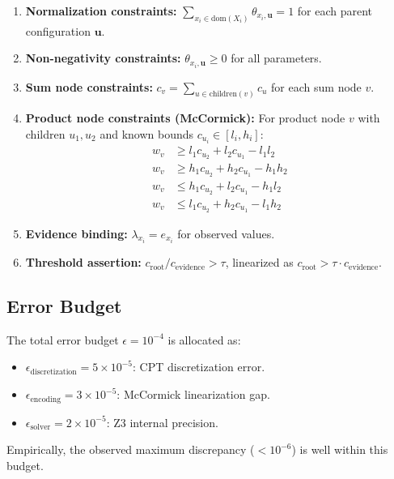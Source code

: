 \documentclass[11pt]{article}
\begin{document}
\begin{enumerate}[nosep]
  \item \textbf{Normalization constraints:}
  $\sum_{x_i \in \text{dom}(X_i)} \theta_{x_i, \mathbf{u}} = 1$ for each parent configuration $\mathbf{u}$.

  \item \textbf{Non-negativity constraints:}
  $\theta_{x_i, \mathbf{u}} \geq 0$ for all parameters.

  \item \textbf{Sum node constraints:}
  $c_v = \sum_{u \in \text{children}(v)} c_u$ for each sum node $v$.

  \item \textbf{Product node constraints (McCormick):}
  For product node $v$ with children $u_1, u_2$ and known bounds $c_{u_i} \in [l_i, h_i]$:
  \begin{align*}
    w_v &\geq l_1 c_{u_2} + l_2 c_{u_1} - l_1 l_2 \\
    w_v &\geq h_1 c_{u_2} + h_2 c_{u_1} - h_1 h_2 \\
    w_v &\leq h_1 c_{u_2} + l_2 c_{u_1} - h_1 l_2 \\
    w_v &\leq l_1 c_{u_2} + h_2 c_{u_1} - l_1 h_2
  \end{align*}

  \item \textbf{Evidence binding:}
  $\lambda_{x_i} = e_{x_i}$ for observed values.

  \item \textbf{Threshold assertion:}
  $c_{\text{root}} / c_{\text{evidence}} > \tau$, linearized as $c_{\text{root}} > \tau \cdot c_{\text{evidence}}$.
\end{enumerate}

\subsection{Error Budget}

The total error budget $\epsilon = 10^{-4}$ is allocated as:
\begin{itemize}[nosep]
  \item $\epsilon_{\text{discretization}} = 5 \times 10^{-5}$: CPT discretization error.
  \item $\epsilon_{\text{encoding}} = 3 \times 10^{-5}$: McCormick linearization gap.
  \item $\epsilon_{\text{solver}} = 2 \times 10^{-5}$: Z3 internal precision.
\end{itemize}
Empirically, the observed maximum discrepancy ($< 10^{-6}$) is well within this budget.
\end{document}
